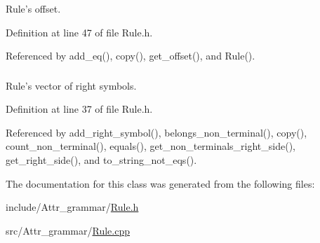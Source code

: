 Rule's offset. 



Definition at line 47 of file Rule.h.

Referenced by add\_\-eq(), copy(), get\_\-offset(), and Rule().\hypertarget{classgenevalmag_1_1Rule_54d3f67fb2b9adb926c9c82aa2d2353b}{
\subsubsection[{r\_\-right\_\-side}]{}}
\label{classgenevalmag_1_1Rule_54d3f67fb2b9adb926c9c82aa2d2353b}


Rule's vector of right symbols. 



Definition at line 37 of file Rule.h.

Referenced by add\_\-right\_\-symbol(), belongs\_\-non\_\-terminal(), copy(), count\_\-non\_\-terminal(), equals(), get\_\-non\_\-terminals\_\-right\_\-side(), get\_\-right\_\-side(), and to\_\-string\_\-not\_\-eqs().

The documentation for this class was generated from the following files:\begin{CompactItemize}
\item 
include/Attr\_\-grammar/\hyperlink{Rule_8h}{Rule.h}\item 
src/Attr\_\-grammar/\hyperlink{Rule_8cpp}{Rule.cpp}\end{CompactItemize}
